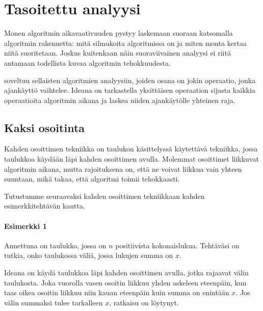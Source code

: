 \chapter{Tasoitettu analyysi}


Monen algoritmin aikavaativuuden pystyy laskemaan
suoraan katsomalla algoritmin rakennetta:
mitä silmukoita algoritmissa on ja miten monta
kertaa niitä suoritetaan.
Joskus kuitenkaan näin suoraviivainen analyysi ei
riitä antamaan todellista kuvaa algoritmin tehokkuudesta.

 soveltuu sellaisten
algoritmien analyysiin, joiden osana on jokin operaatio,
jonka ajankäyttö vaihtelee.
Ideana on tarkastella yksittäisen operaation
sijasta kaikkia operaatioita algoritmin
aikana ja laskea niiden ajankäytölle yhteinen raja.

\section{Kaksi osoitinta}


Kahden osoittimen tekniikka on taulukon käsittelyssä
käytettävä tekniikka, jossa taulukkoa käydään läpi
kahden osoittimen avulla.
Molemmat osoittimet liikkuvat algoritmin aikana,
mutta rajoituksena on, että ne voivat liikkua vain
yhteen suuntaan, mikä takaa, että algoritmi toimii tehokkaasti.

Tutustumme seuraavaksi kahden osoittimen tekniikkaan
kahden esimerkkitehtävän kautta.

\subsubsection{Esimerkki 1}

\begin{task}
Annettuna on taulukko, jossa on $n$ positiivista kokonaislukua.
Tehtäväsi on tutkia, onko taulukossa väliä,
jossa lukujen summa on $x$.
\end{task}

Ideana on käydä taulukkoa läpi kahden osoittimen
avulla, jotka rajaavat välin taulukosta.
Joka vuorolla vasen osoitin liikkuu
yhden askeleen eteenpäin, kun taas oikea osoitin
liikkuu niin kauan eteenpäin kuin summa on enintään $x$.
Jos välin summaksi tulee tarkalleen $x$, ratkaisu on löytynyt.

